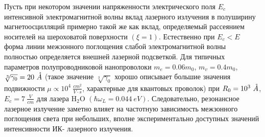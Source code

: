 Пусть при некотором значении напряженности электрического поля $E_c$ интенсивной электромагнитной волны вклад лазерного излучения в полуширину магнетоосцилляций примерно такой же как вклад, определяемый рассеянием носителей на шероховатой поверхности $(\xi =1)$. Естественно при $E_c<E$ форма линии межзонного поглощения слабой электромагнитной волны полностью определяется внешней лазерной подсветкой. Для типичных параметров полупроводниковой нанопроволоки $m_e=0.06m_0$, $m_v=0.4m_0$, $\sqrt[3]{\gamma_0}=20\ \AA $ (такое значение $\sqrt[3]{\gamma_0}$ хорошо описывает большие значения подвижности $\mu \propto 10^4\ \frac{cm^2}{V\cdot s}$, характерные для квантовых проволок) при $R_0=10^3\ \AA $, $E_c= 7\ \frac{V}{cm}$ для лазера $\mathrm{H_2 O}$ $\left(\hbar {\omega }_L=0.044\ eV\right)$. Следовательно, резонансное лазерное излучение заметно влияет на частотную зависимость межзонного поглощения света при небольших, вполне экспериментально доступных значений интенсивности ИК- лазерного излучения.
